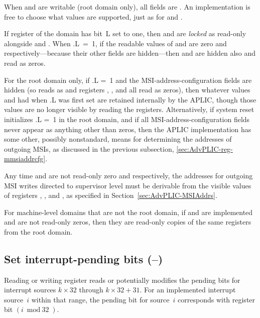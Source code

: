 When  and  are writable
(root domain only), all fields are {\WARL}.
An implementation is free to choose what values are supported, just as
for  and .

If register  of the domain has bit~L set to one,
then  and  are \emph{locked}
as read-only alongside  and .
When .L~=~1, if the readable values of 
and  are zero and  respectively---because
their other fields are hidden---then  and
 are hidden also and read as zeros.

For the root domain only, if .L =~1 and the
MSI-address-configuration fields are hidden (so 
reads as  and registers ,
, and  all read as zeros),
then whatever values  and  had when
.L was first set are retained internally by the APLIC,
though those values are no longer visible by reading the registers.
Alternatively, if system reset initializes .L =~1 in
the root domain, and if all MSI-address-configuration fields never
appear as anything other than zeros, then the APLIC implementation
has some other, possibly nonstandard, means for determining
the addresses of outgoing MSIs, as discussed in the previous
subsection, \ref{sec:AdvPLIC-reg-mmsiaddrcfg}.

Any time  and  are not read-only
zero and  respectively, the addresses for outgoing
MSI writes directed to supervisor level must be derivable from the
visible values of registers , , and
, as specified in Section~\ref{sec:AdvPLIC-MSIAddrs}.

For machine-level domains that are not the root domain,
if  and  are implemented
and are not read-only zeros, then they are read-only
copies of the same registers from the root domain.

\subsection{%
Set interrupt-pending bits (--)%
}

Reading or writing register  reads or potentially
modifies the pending bits for interrupt sources $k\times\mbox{32}$
through ${k\times\mbox{32}+\mbox{31}}$.
For an implemented interrupt source~$i$ within that range, the pending
bit for source~$i$ corresponds with register bit ${(i\bmod\mbox{32})}$.

